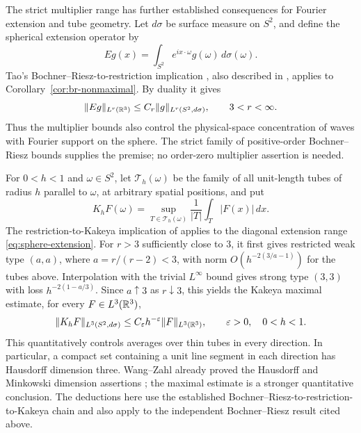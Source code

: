 The strict multiplier range has further established consequences for
Fourier extension and tube geometry. Let $d\sigma$ be surface measure
on $S^2$, and define the spherical extension operator by
\[
 Eg(x)=\int_{S^2}e^{ix\cdot\omega}g(\omega)\,d\sigma(\omega).
\]
Tao's Bochner--Riesz-to-restriction implication
\cite{Tao1999Restriction}, also described in
\cite[Section~3.1]{BeltranHickmanSogge2019Survey}, applies to
Corollary~\ref{cor:br-nonmaximal}. By duality it gives
\begin{equation}\label{eq:sphere-extension}
 \lVert Eg\rVert_{L^r(\mathbb R^3)}\le C_r\lVert g\rVert_{L^r(S^2,d\sigma)},
 \qquad 3<r<\infty.
\end{equation}
Thus the multiplier bounds also control the physical-space
concentration of waves with Fourier support on the sphere. The strict
family of positive-order Bochner--Riesz bounds supplies the premise;
no order-zero multiplier assertion is needed.

For $0<h<1$ and $\omega\in S^2$, let $\mathcal T_h(\omega)$ be
the family of all unit-length tubes of radius $h$ parallel to $\omega$,
at arbitrary spatial positions, and put
\[
 K_hF(\omega)=\sup_{T\in\mathcal T_h(\omega)}
              \frac1{|T|}\int_T|F(x)|\,dx.
\]
The restriction-to-Kakeya implication of
\cite[Section~4, Proposition~4.1]{Wolff1999Kakeya} applies to the
diagonal extension range \eqref{eq:sphere-extension}. For $r>3$
sufficiently close to $3$, it first gives restricted weak type $(a,a)$,
where $a=r/(r-2)<3$, with norm $O(h^{-2(3/a-1)})$ for the tubes above.
Interpolation with the trivial $L^\infty$ bound gives strong type
$(3,3)$ with loss $h^{-2(1-a/3)}$. Since $a\uparrow3$ as
$r\downarrow3$, this yields the Kakeya maximal estimate, for every
$F\in L^3(\mathbb R^3)$,
\begin{equation}\label{eq:kakeya-maximal}
 \lVert K_hF\rVert_{L^3(S^2,d\sigma)}
 \le C_\varepsilon h^{-\varepsilon}\lVert F\rVert_{L^3(\mathbb R^3)},
 \qquad \varepsilon>0,\quad 0<h<1.
\end{equation}
This quantitatively controls averages over thin tubes in every
direction. In particular, a compact set containing a unit line segment
in each direction has Hausdorff dimension three. Wang--Zahl already
proved the Hausdorff and Minkowski dimension assertions
\cite[Theorem~1.1]{WangZahl2025Kakeya}; the maximal estimate is a
stronger quantitative conclusion. The deductions here use the
established Bochner--Riesz-to-restriction-to-Kakeya chain and also apply
to the independent Bochner--Riesz result cited above.
